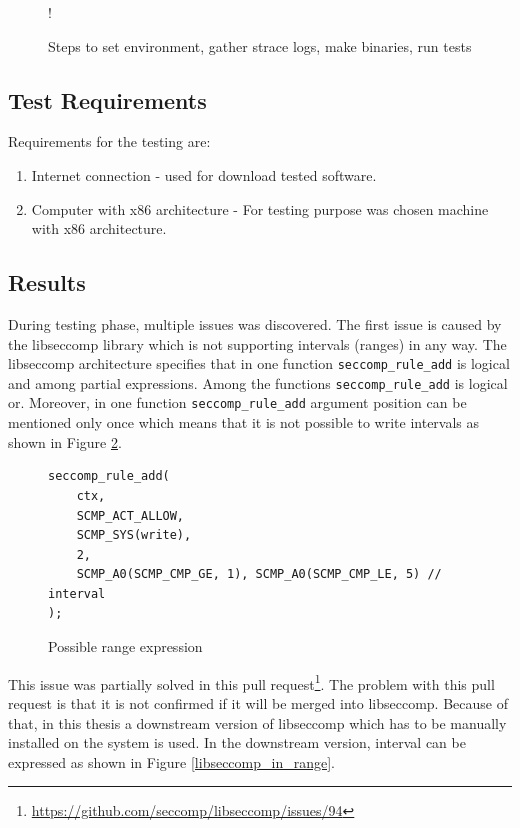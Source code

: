 \begin{figure}[H]
  \centering
   {!} {
    
  }
  \caption{Steps to set environment, gather strace logs, make binaries, run tests}
  \label{fig:tikz:setenv_architecture}
\end{figure}

\subsection{Test Requirements}
Requirements for the testing are:
\begin{enumerate}
	\item Internet connection - used for download tested software.
	\item Computer with x86 architecture - For testing purpose was chosen
	machine with x86 architecture.
\end{enumerate}

\subsection{Results}
During testing phase, multiple issues was discovered. The first issue is caused
by the libseccomp library which is not supporting intervals (ranges) in any way.
The libseccomp architecture specifies that in one function
\texttt{seccomp\_rule\_add} is logical and among partial expressions. Among the
functions \texttt{seccomp\_rule\_add} is logical or. Moreover, in one function
\texttt{seccomp\_rule\_add} argument position can be mentioned only once which
means that it is not possible to write intervals as shown in Figure
\ref{libseccomp_native}.

\begin{figure}[h]
	\label{libseccomp_native}
	\lstset{style=c++}
	\begin{lstlisting}
seccomp_rule_add(
	ctx,
	SCMP_ACT_ALLOW,
	SCMP_SYS(write),
	2,
	SCMP_A0(SCMP_CMP_GE, 1), SCMP_A0(SCMP_CMP_LE, 5) // interval
);
	\end{lstlisting}
	\caption{Possible range expression}
\end{figure}

This issue was partially solved in this pull
request\footnote{\url{https://github.com/seccomp/libseccomp/issues/94}}. The
problem with this pull request is that it is not confirmed if it will be merged
into libseccomp. Because of that, in this thesis a downstream version of
libseccomp which has to be manually installed on the system is used. In the downstream
version, interval can be expressed as shown in Figure \ref{libseccomp_in_range}.

